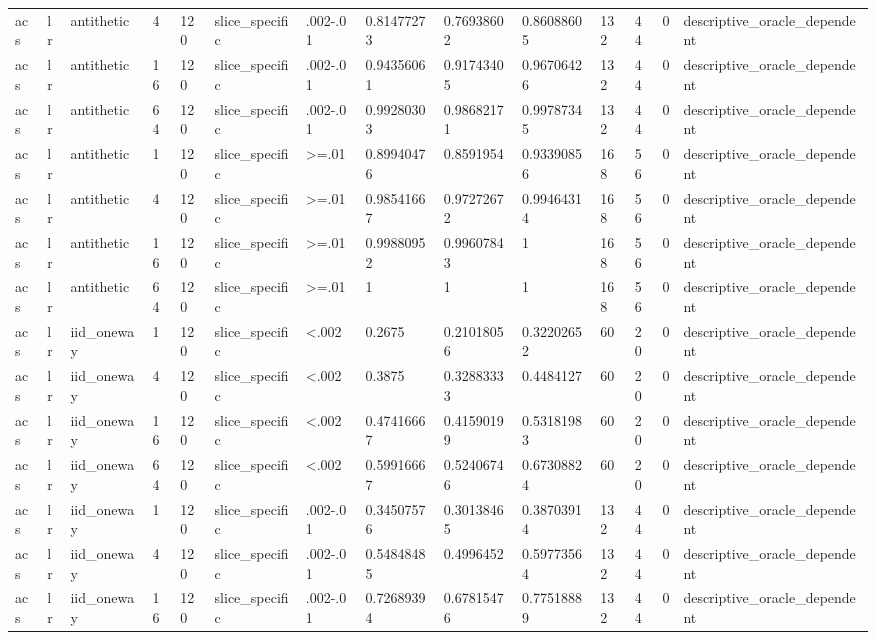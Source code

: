 \begin{tabular}{llllllllllllll}
acs & lr & antithetic & 4 & 120 & slice\_specific & .002-.01 & 0.81477273 & 0.76938602 & 0.86088605 & 132 & 44 & 0 & descriptive\_oracle\_dependent \\
acs & lr & antithetic & 16 & 120 & slice\_specific & .002-.01 & 0.94356061 & 0.91743405 & 0.96706426 & 132 & 44 & 0 & descriptive\_oracle\_dependent \\
acs & lr & antithetic & 64 & 120 & slice\_specific & .002-.01 & 0.99280303 & 0.98682171 & 0.99787345 & 132 & 44 & 0 & descriptive\_oracle\_dependent \\
acs & lr & antithetic & 1 & 120 & slice\_specific & >=.01 & 0.89940476 & 0.8591954 & 0.93390856 & 168 & 56 & 0 & descriptive\_oracle\_dependent \\
acs & lr & antithetic & 4 & 120 & slice\_specific & >=.01 & 0.98541667 & 0.97272672 & 0.99464314 & 168 & 56 & 0 & descriptive\_oracle\_dependent \\
acs & lr & antithetic & 16 & 120 & slice\_specific & >=.01 & 0.99880952 & 0.99607843 & 1 & 168 & 56 & 0 & descriptive\_oracle\_dependent \\
acs & lr & antithetic & 64 & 120 & slice\_specific & >=.01 & 1 & 1 & 1 & 168 & 56 & 0 & descriptive\_oracle\_dependent \\
acs & lr & iid\_oneway & 1 & 120 & slice\_specific & <.002 & 0.2675 & 0.21018056 & 0.32202652 & 60 & 20 & 0 & descriptive\_oracle\_dependent \\
acs & lr & iid\_oneway & 4 & 120 & slice\_specific & <.002 & 0.3875 & 0.32883333 & 0.4484127 & 60 & 20 & 0 & descriptive\_oracle\_dependent \\
acs & lr & iid\_oneway & 16 & 120 & slice\_specific & <.002 & 0.47416667 & 0.41590199 & 0.53181983 & 60 & 20 & 0 & descriptive\_oracle\_dependent \\
acs & lr & iid\_oneway & 64 & 120 & slice\_specific & <.002 & 0.59916667 & 0.52406746 & 0.67308824 & 60 & 20 & 0 & descriptive\_oracle\_dependent \\
acs & lr & iid\_oneway & 1 & 120 & slice\_specific & .002-.01 & 0.34507576 & 0.30138465 & 0.38703914 & 132 & 44 & 0 & descriptive\_oracle\_dependent \\
acs & lr & iid\_oneway & 4 & 120 & slice\_specific & .002-.01 & 0.54848485 & 0.4996452 & 0.59773564 & 132 & 44 & 0 & descriptive\_oracle\_dependent \\
acs & lr & iid\_oneway & 16 & 120 & slice\_specific & .002-.01 & 0.72689394 & 0.67815476 & 0.77518889 & 132 & 44 & 0 & descriptive\_oracle\_dependent \\

\end{tabular}
